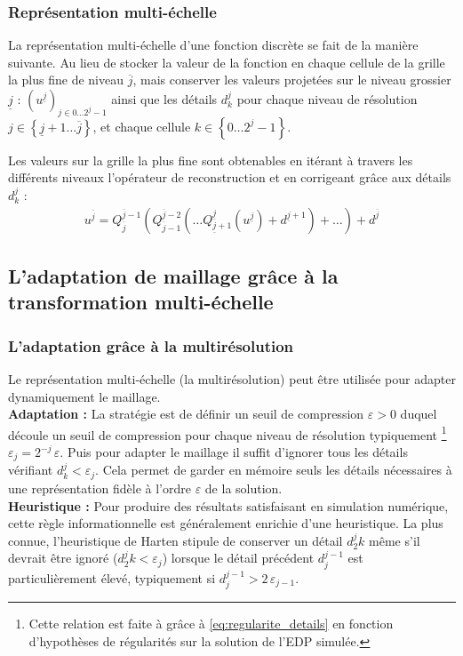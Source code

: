     \subsubsection{Représentation multi-échelle}
        La représentation multi-échelle d'une fonction discrète se fait de la manière suivante. 
        Au lieu de stocker la valeur de la fonction en chaque cellule de la grille la plus fine de niveau $\overline j$, mais conserver les valeurs 
        projetées sur le niveau grossier $\underline j$ : $\left(u^{\underline j}\right)_{j \in {0 \dots 2^{\underline j}-1}}$ ainsi que les détails $d^j_k$
        pour chaque niveau de résolution $j \in \left\{ \underline{j} +1 \dots \overline j\right\}$, et chaque cellule $k \in \left\{0 \dots 2^j - 1\right\}$.\par
        Les valeurs sur la grille la plus fine sont obtenables
        en itérant à travers les différents niveaux l'opérateur de reconstruction et en corrigeant grâce aux détails $d^j_k$ : 
        \begin{align}
            u^{\overline j} = Q^{\overline j -1}_{\overline j}
            \left( Q^{\overline j -2}_{\overline j - 1}
                \left(\dots  Q^{\underline j}_{\underline j +1}
                    \left(u^{\underline{j}}
                    \right) +  d^{\underline j + 1}
                \right) +  \dots
            \right) + d^{\overline j}
        \end{align}
\subsection{L'adaptation de maillage grâce à la transformation multi-échelle}
    \subsubsection{L'adaptation grâce à la multirésolution}
    Le représentation multi-échelle (la multirésolution) peut être utilisée pour adapter dynamiquement le maillage.\\
    \textbf{Adaptation : } La stratégie est de définir un seuil de compression $\varepsilon >0$ duquel découle un seuil de compression pour chaque niveau de résolution typiquement
    \footnote{Cette relation est faite à grâce à \eqref{eq:regularite_details} en fonction d'hypothèses de régularités sur la solution de l'EDP simulée.} 
    $\varepsilon_j = 2^{-j} \, \varepsilon$. 
    Puis pour adapter le maillage il suffit d'ignorer tous les détails vérifiant $d^j_k < \varepsilon_j$. 
    Cela permet de garder en mémoire seuls les détails nécessaires à une représentation fidèle à l'ordre $\varepsilon$ de la solution.\\
    \textbf{Heuristique : } Pour produire des résultats satisfaisant en simulation numérique, cette règle informationnelle est généralement enrichie d'une heuristique.
    La plus connue, l’heuristique de Harten \cite{harten1994} stipule de conserver un détail $d^j_2k$ même s'il devrait être ignoré ($d^j_2k < \varepsilon_j$) 
    lorsque le détail précédent $d_j^{j-1}$ est particulièrement élevé, typiquement si $d_j^{j-1} > 2 \, \varepsilon_{j-1}$.

